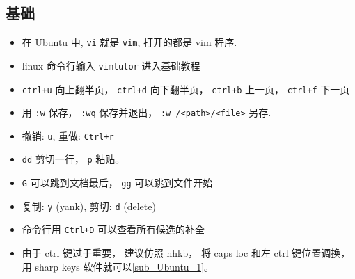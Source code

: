 
\begin{issues}
\issueDraft
\end{issues}

\subsection{基础}
\begin{itemize}
\item 在 Ubuntu 中, \verb`vi` 就是 \verb`vim`, 打开的都是 vim 程序.
\item linux 命令行输入 \verb`vimtutor` 进入基础教程
\item \verb`ctrl+u` 向上翻半页， \verb`ctrl+d` 向下翻半页， \verb`ctrl+b` 上一页， \verb`ctrl+f` 下一页
\item 用 \verb`:w` 保存， \verb`:wq` 保存并退出， \verb`:w /<path>/<file>` 另存.
\item 撤销: \verb`u`, 重做: \verb`Ctrl+r`
\item \verb`dd` 剪切一行， \verb`p` 粘贴。
\item \verb`G` 可以跳到文档最后， \verb`gg` 可以跳到文件开始
\item 复制: \verb`y` (yank), 剪切: \verb`d` (delete)
\item 命令行用 \verb`Ctrl+D` 可以查看所有候选的补全
\item 由于 ctrl 键过于重要， 建议仿照 hhkb， 将 caps loc 和左 ctrl 键位置调换， 用 sharp keys 软件就可以\autoref{sub_Ubuntu_1}。
\end{itemize}

